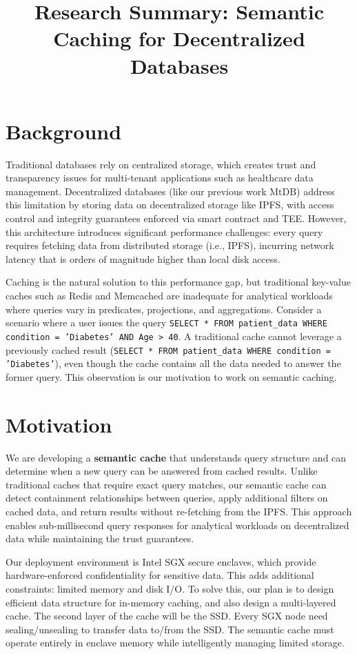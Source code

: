 \documentclass[12pt]{article}
\title{Research Summary: Semantic Caching for Decentralized Databases}
\author{}
\date{}
\begin{document}
\maketitle

\section{Background}

Traditional databases rely on centralized storage, which creates trust and transparency issues for multi-tenant applications such as healthcare data management. Decentralized databases (like our previous work MtDB) address this limitation by storing data on decentralized storage like IPFS, with access control and integrity guarantees enforced via smart contract and TEE. However, this architecture introduces significant performance challenges: every query requires fetching data from distributed storage (i.e., IPFS), incurring network latency that is orders of magnitude higher than local disk access.

Caching is the natural solution to this performance gap, but traditional key-value caches such as Redis and Memcached are inadequate for analytical workloads where queries vary in predicates, projections, and aggregations. Consider a scenario where a user issues the query \texttt{SELECT * FROM patient\_data WHERE condition = 'Diabetes' AND Age > 40}. A traditional cache cannot leverage a previously cached result (\texttt{SELECT * FROM patient\_data WHERE condition = 'Diabetes'}), even though the cache contains all the data needed to answer the former query. This observation is our motivation to work on semantic caching.

\section{Motivation}

We are developing a \textbf{semantic cache} that understands query structure and can determine when a new query can be answered from cached results. Unlike traditional caches that require exact query matches, our semantic cache can detect containment relationships between queries, apply additional filters on cached data, and return results without re-fetching from the IPFS. This approach enables sub-millisecond query responses for analytical workloads on decentralized data while maintaining the trust guarantees.

Our deployment environment is Intel SGX secure enclaves, which provide hardware-enforced confidentiality for sensitive data. This adds additional constraints: limited memory and disk I/O. To solve this, our plan is to design efficient data structure for in-memory caching, and also design a multi-layered cache. The second layer of the cache will be the SSD. Every SGX node need sealing/unsealing to transfer data to/from the SSD. The semantic cache must operate entirely in enclave memory while intelligently managing limited storage.
\end{document}
